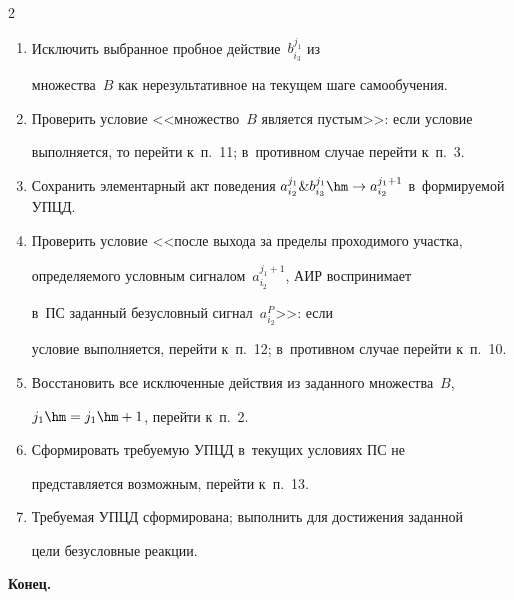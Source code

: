 \begin{multicols}{2}
\begin{enumerate}[1.]
сигнала~$a_{i_2}^{j_1+1}$.


  \item Исключить выбранное пробное действие~$b_{i_3}^{j_1}$ из 


множества~$B$ как нерезультативное на текущем шаге са\-мо\-обуче\-ния. 


  \item Проверить условие <<множество~$B$ является пус\-тым>>: если условие 


выполняется, то перейти к~п.~11; в~противном случае перейти к~п.~3. 


  \item  Сохранить элементарный акт поведения $a_{i_2}^{j_1} \& 


b_{i_3}^{j_1} \hm\to a_{i_2}^{j_1+1}$ в~фор\-ми\-ру\-емой УПЦД.


  \item  Проверить условие <<после выхода за пределы проходимого участка, 


опре\-де\-ля\-емо\-го условным сигналом~$a_{i_2}^{j_1+1}$, АИР воспринимает 


в~ПС заданный без\-услов\-ный сигнал~$a_{i_2}^P$>>: если 


условие выполняется, перейти к~п.~12; в~противном случае перейти к~п.~10.


  \item  Восстановить все исключенные действия из заданного множества~$B$, 


$j_1\hm= j_1\hm+1$, перейти к~п.~2.


  \item  Сформировать тре\-бу\-емую УПЦД в~текущих условиях ПС не 


пред\-став\-ля\-ет\-ся воз\-мож\-ным, перейти к~п.~13.


  \item  Требуемая УПЦД сформирована; выполнить для достижения заданной 


цели безуслов\-ные реакции.\\[-14pt]


  \end{enumerate}


  


 \noindent


  \textbf{Конец.}


  


  \smallskip


  



\end{multicols}
